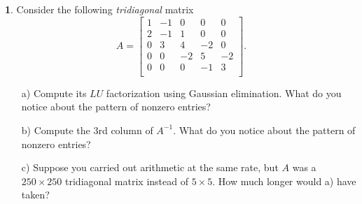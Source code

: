 \documentclass{article}
\theoremstyle{definition}
\newtheorem{prob}{}
\begin{document}
\begin{prob}
	Consider the following \emph{tridiagonal} matrix
	\[A=\begin{bmatrix}
		1 & -1& 0&0&0\\
		2&-1&1&0&0\\
		0&3&4&-2&0\\
		0&0&-2&5&-2\\
		0&0&0&-1&3\\
	\end{bmatrix}.\]
\begin{itemize}
	\item[a)] Compute its $LU$ factorization using Gaussian elimination. What do you notice about the pattern of nonzero entries?
	\item[b)] Compute the 3rd column of $A^{-1}$. What do you notice about the pattern of nonzero entries?
	\item[c)] Suppose you carried out arithmetic at the same rate, but $A$ was a $250 \times 250$ tridiagonal matrix instead of $5 \times 5$. How much longer would a) have taken?
\end{itemize}
\end{prob}
\end{document}

